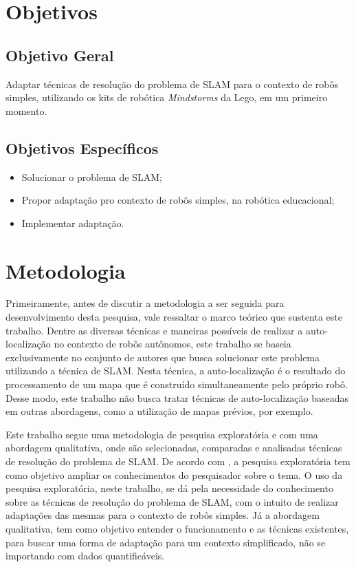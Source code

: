 	\section{Objetivos}

	\subsection{Objetivo Geral} %
	\label{sub:objetivos_gerais}
	
		Adaptar técnicas de resolução do problema de SLAM para o contexto de robôs simples, utilizando os kits de robótica \textit{Mindstorms} da Lego, em um primeiro momento.


	\subsection{Objetivos Específicos} %
	\label{sub:objetivos_específicos}
		 
	\begin{itemize}
		\item Solucionar o problema de SLAM;
		\item Propor adaptação pro contexto de robôs simples, na robótica educacional;
		\item Implementar adaptação.
	\end{itemize}
	

	\section[Metodologia]{Metodologia}

	Primeiramente, antes de discutir a metodologia a ser seguida para desenvolvimento desta pesquisa, vale ressaltar o marco teórico que sustenta este trabalho. Dentre as diversas técnicas e maneiras possíveis de realizar a auto-localização no contexto de robôs autônomos, este trabalho se baseia exclusivamente no conjunto de autores que busca solucionar este problema utilizando a técnica de SLAM. Nesta técnica, a auto-localização é o resultado do processamento de um mapa que é construído simultaneamente pelo próprio robô. Desse modo, este trabalho não busca tratar técnicas de auto-localização baseadas em outras abordagens, como a utilização de mapas prévios, por exemplo.

Este trabalho segue uma metodologia de pesquisa exploratória e com uma abordagem qualitativa, onde são selecionadas, comparadas e analisadas técnicas de resolução do problema de SLAM. De acordo com \cite{metodologiaCientifica}, a pesquisa exploratória tem como objetivo ampliar os conhecimentos do pesquisador sobre o tema. O uso da pesquisa exploratória, neste trabalho, se dá pela necessidade do conhecimento sobre as técnicas de resolução do problema de SLAM, com o intuito de realizar adaptações das mesmas para o contexto de robôs simples. Já a abordagem qualitativa, tem como objetivo entender o funcionamento e as técnicas existentes, para buscar uma forma de adaptação para um contexto simplificado, não se importando com dados quantificáveis.

